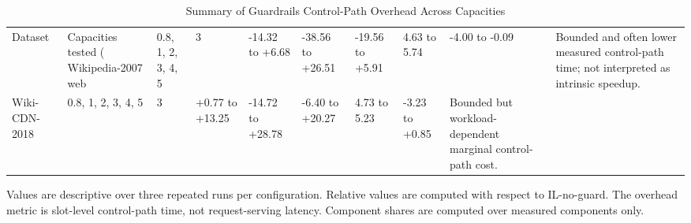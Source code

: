 \begin{table}[t]
\centering
\footnotesize
\caption{Summary of Guardrails Control-Path Overhead Across Capacities}
\label{tab:claim_driven_overhead_main}
\begin{tabular}{lllllllll}
\toprule
Dataset & Capacities tested (%
\midrule
Wikipedia-2007 web & 0.8, 1, 2, 3, 4, 5 & 3 & -14.32 to +6.68 & -38.56 to +26.51 & -19.56 to +5.91 & 4.63 to 5.74 & -4.00 to -0.09 & Bounded and often lower measured control-path time; not interpreted as intrinsic speedup. \\
Wiki-CDN-2018 & 0.8, 1, 2, 3, 4, 5 & 3 & +0.77 to +13.25 & -14.72 to +28.78 & -6.40 to +20.27 & 4.73 to 5.23 & -3.23 to +0.85 & Bounded but workload-dependent marginal control-path cost. \\
\bottomrule
\end{tabular}
\vspace{0.4ex}\par\scriptsize{Values are descriptive over three repeated runs per configuration. Relative values are computed with respect to IL-no-guard. The overhead metric is slot-level control-path time, not request-serving latency. Component shares are computed over measured components only.}
\end{table}
